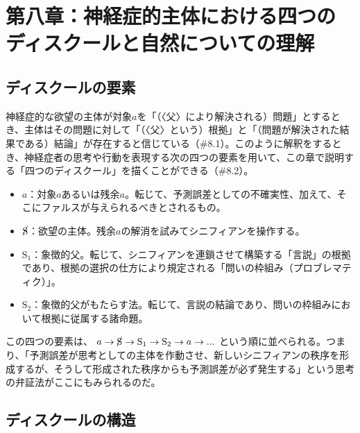 \section{第八章：神経症的主体における四つのディスクールと自然についての理解}\label{ux7b2cux516bux7ae0ux795eux7d4cux75c7ux7684ux4e3bux4f53ux306bux304aux3051ux308bux56dbux3064ux306eux30c7ux30a3ux30b9ux30afux30fcux30ebux3068ux81eaux7136ux306bux3064ux3044ux3066ux306eux7406ux89e3}

\subsection{ディスクールの要素}\label{ux30c7ux30a3ux30b9ux30afux30fcux30ebux306eux8981ux7d20}

神経症的な欲望の主体が対象\(a\)を「（〈父〉により解決される）問題」とするとき、主体はその問題に対して「（〈父〉という）根拠」と「（問題が解決された結果である）結論」が存在すると信じている（\#8.1）。このように解釈をするとき、神経症者の思考や行動を表現する次の四つの要素を用いて、この章で説明する「四つのディスクール」を描くことができる（\#8.2）。

\begin{itemize}
\tightlist
\item
  \(a\)：対象\(a\)あるいは残余\(a\)。転じて、予測誤差としての不確実性、加えて、そこにファルスが与えられるべきとされるもの。
\item
  \(\cancel{\textrm{S}}\)：欲望の主体。残余\(a\)の解消を試みてシニフィアンを操作する。
\item
  \(\textrm{S}_1\)：象徴的父。転じて、シニフィアンを連鎖させて構築する「言説」の根拠であり、根拠の選択の仕方により規定される「問いの枠組み（プロブレマティク）」。
\item
  \(\textrm{S}_2\)：象徴的父がもたらす法。転じて、言説の結論であり、問いの枠組みにおいて根拠に従属する諸命題。
\end{itemize}

この四つの要素は、
\(a \rightarrow \cancel{\textrm{S}} \rightarrow \textrm{S}_1 \rightarrow \textrm{S}_2 \rightarrow a \rightarrow ...\)
という順に並べられる。つまり、「予測誤差が思考としての主体を作動させ、新しいシニフィアンの秩序を形成するが、そうして形成された秩序からも予測誤差が必ず発生する」という思考の弁証法がここにもみられるのだ。

\subsection{ディスクールの構造}\label{ux30c7ux30a3ux30b9ux30afux30fcux30ebux306eux69cbux9020}

